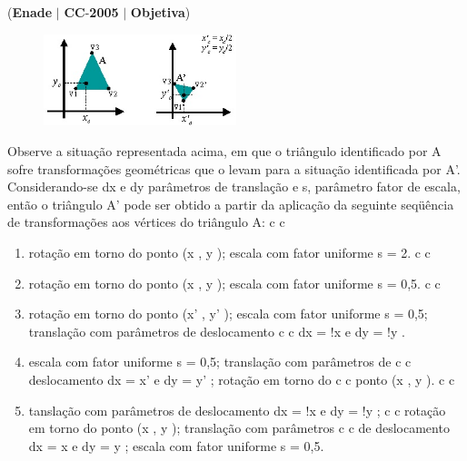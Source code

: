 \documentclass{exam}
\begin{document}
\begin{questions}
\question (\textbf{Enade} $|$ \textbf{CC}-\textbf{2005} $|$ \textbf{Objetiva})

\begin{figure}[H]
	\begin{center}
		\includegraphics[width=0.5\textwidth]{CIENCIA_DA_COMPUTACAO_Prova2005-utf8_figuras/fig-0041.jpg}
	\end{center}
\end{figure}
Observe a situação representada acima, em que o triângulo
identificado por A sofre transformações geométricas que o levam para
a situação identificada por A’. Considerando-se dx e dy parâmetros
de translação e s, parâmetro fator de escala, então o triângulo A’ pode
ser obtido a partir da aplicação da seguinte seqüência de
transformações aos vértices do triângulo A:
c c
	\begin{enumerate}[label=\alph*)]
		\item  rotação em torno do ponto (x , y ); escala com fator uniforme
s = 2.
c c
		\item  rotação em torno do ponto (x , y ); escala com fator uniforme
s = 0,5.
c c
		\item  rotação em torno do ponto (x' , y' ); escala com fator
uniforme s = 0,5; translação com parâmetros de deslocamento
c c
dx = !x e dy = !y .
		\item  escala com fator uniforme s = 0,5; translação com parâmetros de
c c
deslocamento dx = x' e dy = y' ; rotação em torno do
c c
ponto (x , y ).
c c
		\item  tanslação com parâmetros de deslocamento dx = !x e dy = !y ;
c c
rotação em torno do ponto (x , y ); translação com parâmetros
c c
de deslocamento dx = x e dy = y ; escala com fator uniforme
s = 0,5.
	\end{enumerate}


\end{questions}
\end{document}
